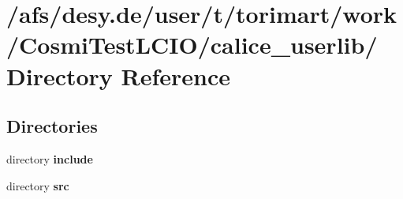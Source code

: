 \section{/afs/desy.de/user/t/torimart/work/CosmiTestLCIO/calice\_\-userlib/ Directory Reference}
\label{dir_36843d1d4246be2b2ac1dd04c3c30114}
\subsection*{Directories}
\begin{DoxyCompactItemize}
\item 
directory {\bf include}
\item 
directory {\bf src}
\end{DoxyCompactItemize}
